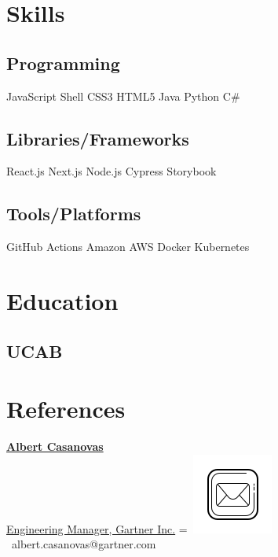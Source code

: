 \documentclass[]{main}
\begin{document}
\begin{paracol}{2}
\switchcolumn[1]


\section{Skills}
\subsection{Programming}
\sectionsep
{}
JavaScript \textbullet{} Shell \textbullet{} CSS3 \textbullet{} HTML5
\sectionsep
{}
Java \textbullet{} Python \textbullet{} C#
\sectionsep
\sectionsep
\subsection{Libraries/Frameworks}
\sectionsep
React.js \textbullet{} Next.js \textbullet{} Node.js \textbullet{} Cypress \textbullet{} Storybook
\sectionsep
\sectionsep
\subsection{Tools/Platforms}
\sectionsep
GitHub Actions \textbullet{} Amazon AWS \textbullet{} Docker \textbullet{} Kubernetes

\sectionsep


\section{Education} 
\subsection{UCAB}
\sectionsep



\section{References} 
\href{https://www.linkedin.com/in/casanovasalbert/}{\textbf{Albert Casanovas} \\ Engineering Manager, Gartner Inc.}
\begingroup
{}=\hbox{
\includegraphics[scale=0.2,trim={1cm 1.2cm 1.2cm 0cm}]{images/icons/mail.png}\hspace{0.3cm} albert.casanovas@gartner.com
}
\parbox{\wd0}{}
\endgroup


\end{paracol}
\end{document}
